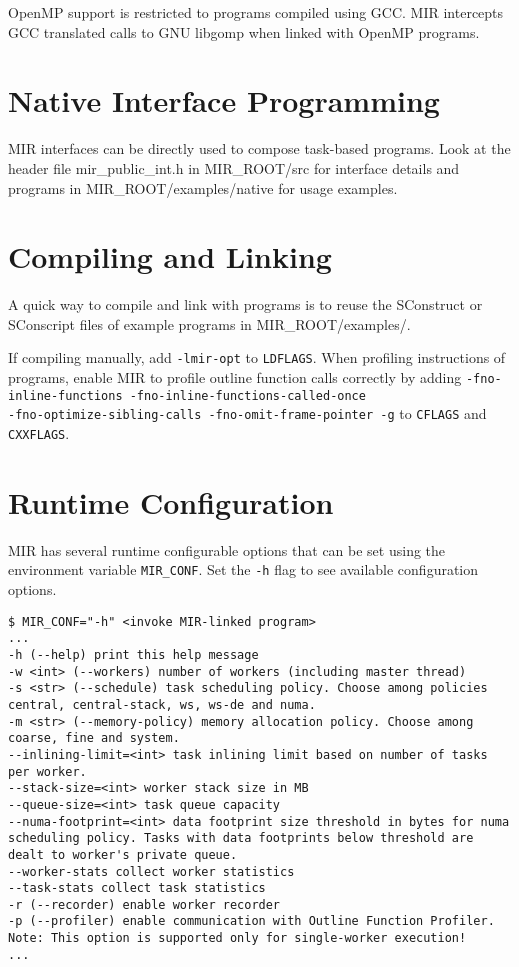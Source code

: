 \documentclass[11pt,a4paper]{article}
\begin{document}
OpenMP support is restricted to programs compiled using GCC. MIR intercepts GCC translated calls to GNU libgomp when linked with OpenMP programs.

\section{Native Interface Programming}\label{sec:native-interface-programming}

MIR interfaces can be directly used to compose task-based programs. Look at the header file \textsf{mir\_public\_int.h} in \textsf{MIR\_ROOT/src} for interface details and programs in \textsf{MIR\_ROOT/examples/native} for usage examples.

\section{Compiling and Linking}\label{sec:compiling-and-linking}

A quick way to compile and link with programs is to reuse the \textsf{SConstruct} or \textsf{SConscript} files of example programs in \textsf{MIR\_ROOT/examples/}.

If compiling manually, add \texttt{-lmir-opt} to \texttt{LDFLAGS}. When profiling instructions of programs, enable MIR to profile outline function calls correctly by adding \texttt{{\footnotesize -fno-inline-functions -fno-inline-functions-called-once \\ -fno-optimize-sibling-calls -fno-omit-frame-pointer -g}}  to \texttt{CFLAGS} and \\\texttt{CXXFLAGS}.

\section{Runtime Configuration}\label{sec:runtime-configuration}

MIR has several runtime configurable options that can be set using the environment variable \texttt{MIR\_CONF}. Set the \texttt{-h} flag to see available configuration options.

\begin{lstlisting}[style=MyInputStyle]
$ MIR_CONF="-h" <invoke MIR-linked program>
...
-h (--help) print this help message
-w <int> (--workers) number of workers (including master thread)
-s <str> (--schedule) task scheduling policy. Choose among policies central, central-stack, ws, ws-de and numa.
-m <str> (--memory-policy) memory allocation policy. Choose among coarse, fine and system.
--inlining-limit=<int> task inlining limit based on number of tasks per worker.
--stack-size=<int> worker stack size in MB
--queue-size=<int> task queue capacity
--numa-footprint=<int> data footprint size threshold in bytes for numa scheduling policy. Tasks with data footprints below threshold are dealt to worker's private queue.
--worker-stats collect worker statistics
--task-stats collect task statistics
-r (--recorder) enable worker recorder
-p (--profiler) enable communication with Outline Function Profiler. Note: This option is supported only for single-worker execution!
...
\end{lstlisting}
\end{document}
